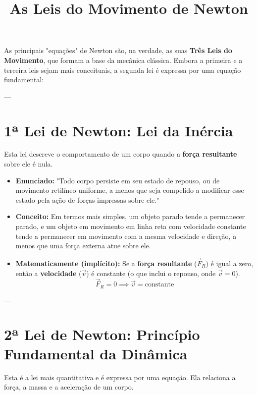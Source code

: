 \documentclass{article}
\title{As Leis do Movimento de Newton}
\author{} %
\date{} %
\begin{document}
\maketitle

As principais "equações" de Newton são, na verdade, as suas \textbf{Três Leis do Movimento}, que formam a base da mecânica clássica. Embora a primeira e a terceira leis sejam mais conceituais, a segunda lei é expressa por uma equação fundamental:

---

\section{1ª Lei de Newton: Lei da Inércia}

Esta lei descreve o comportamento de um corpo quando a \textbf{força resultante} sobre ele é nula.

\begin{itemize}
    \item \textbf{Enunciado:} "Todo corpo persiste em seu estado de repouso, ou de movimento retilíneo uniforme, a menos que seja compelido a modificar esse estado pela ação de forças impressas sobre ele."
    \item \textbf{Conceito:} Em termos mais simples, um objeto parado tende a permanecer parado, e um objeto em movimento em linha reta com velocidade constante tende a permanecer em movimento com a mesma velocidade e direção, a menos que uma força externa atue sobre ele.
    \item \textbf{Matematicamente (implícito):} Se a \textbf{força resultante} ($\vec{F}_{R}$) é igual a zero, então a \textbf{velocidade} ($\vec{v}$) é constante (o que inclui o repouso, onde $\vec{v} = 0$).
    $$ \vec{F}_{R} = 0 \implies \vec{v} = \text{constante} $$
\end{itemize}

---

\section{2ª Lei de Newton: Princípio Fundamental da Dinâmica}

Esta é a lei mais quantitativa e é expressa por uma equação. Ela relaciona a força, a massa e a aceleração de um corpo.
\end{document}
